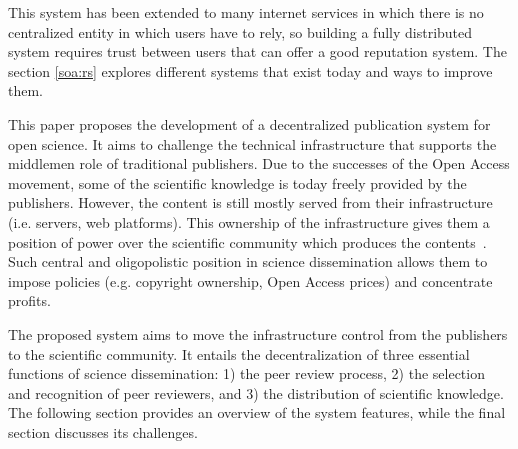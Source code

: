 This system has been extended to many internet services in which there is no
centralized entity in which users have to rely, so building a fully distributed
system requires trust between users that can offer a good reputation system. The
section \ref{soa:rs} explores different systems that exist today and ways to
improve them.

This paper proposes the development of a decentralized publication system for
open science. It aims to challenge the technical infrastructure that supports
the middlemen role of traditional publishers. Due to the successes of the Open
Access movement, some of the scientific knowledge is today freely provided by
the publishers. However, the content is still mostly served from their
infrastructure (i.e. servers, web platforms). This ownership of the
infrastructure gives them a position of power over the scientific community
which produces the contents~\cite{fuster2010governance}. Such central and
oligopolistic position in science dissemination allows them to impose policies
(e.g. copyright ownership, Open Access prices) and concentrate profits.

The proposed system aims to move the infrastructure control from the publishers
to the scientific community. It entails the decentralization of three essential
functions of science dissemination: 1) the peer review process, 2) the selection
and recognition of peer reviewers, and 3) the distribution of scientific
knowledge. The following section provides an overview of the system features,
while the final section discusses its challenges.


